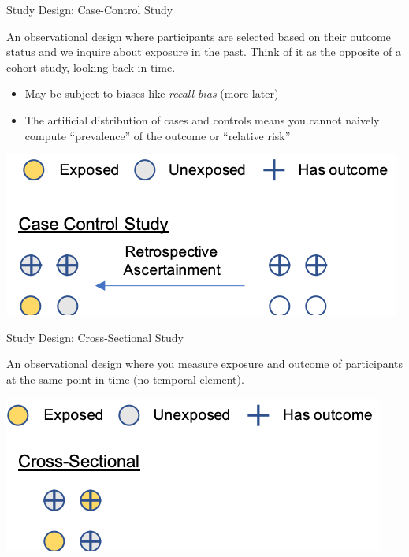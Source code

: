 \documentclass[ignorenonframetext,]{beamer}
\providecommand{\tightlist}{%
  \setlength{\itemsep}{0pt}\setlength{\parskip}{0pt}}
\begin{document}
\begin{frame}{Study Design: Case-Control Study}
\protect\hypertarget{study-design-case-control-study}{}

An observational design where participants are selected based on their
outcome status and we inquire about exposure in the past. Think of it as
the opposite of a cohort study, looking back in time.

\begin{itemize}
\tightlist
\item
  May be subject to biases like \emph{recall bias} (more later)
\item
  The artificial distribution of cases and controls means you cannot
  naively compute ``prevalence'' of the outcome or ``relative risk''
\end{itemize}

\includegraphics{../media/study-design-cc.png}

\end{frame}

\begin{frame}{Study Design: Cross-Sectional Study}
\protect\hypertarget{study-design-cross-sectional-study}{}

An observational design where you measure exposure and outcome of
participants at the same point in time (no temporal element).

\includegraphics{../media/study-design-cross.png}

\end{frame}
\end{document}
